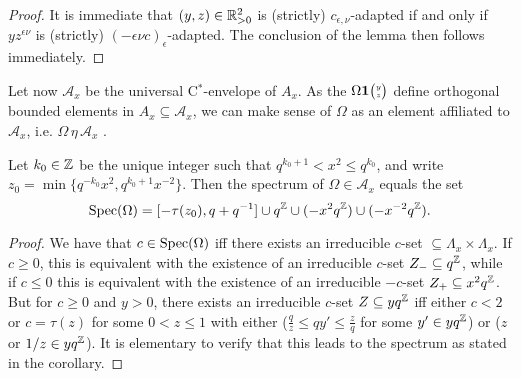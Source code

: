 \begin{proof} It is immediate that $(y,z)\in \mathbb{R}_{>0}^2$ is (strictly) $c_{\epsilon,\nu}$-adapted if and only if $yz^{\epsilon\nu}$ is (strictly) $(-\epsilon\nu c)_{\epsilon}$-adapted. The conclusion of the lemma then follows immediately.
\end{proof}

Let now $\mathcal{A}_x$ be the universal C$^*$-envelope of $A_x$. As the $\Omega\mathbf{1}{\tiny {\begin{pmatrix} y\\z\end{pmatrix}}}$ define orthogonal bounded elements in $A_x\subseteq \mathcal{A}_x$, we can make sense of $\Omega$ as an element affiliated to $\mathcal{A}_x$, i.e. $\Omega\,\eta\,\mathcal{A}_x$ \cite{Wor2}. 


\begin{Cor} Let $k_0\in \mathbb{Z}$ be the unique integer such that $q^{k_0+1}<x^2\leq q^{k_0}$, and write $z_{0} = \min \{q^{-k_0}x^2,q^{k_0+1}x^{-2}\}$. Then the spectrum of $\Omega \in \mathcal{A}_x$ equals the set \[\operatorname{\mathrm{Spec}}(\Omega) = \lbrack -\tau(z_0),q+q^{-1}\rbrack \cup q^{\mathbb{Z}}\cup (-x^2q^{\mathbb{Z}}) \cup (-x^{-2}q^{\mathbb{Z}}).\]
\end{Cor}
\begin{proof} We have that $c \in \operatorname{\mathrm{Spec}}(\Omega)$ iff there exists an irreducible $c$-set $\subseteq \Lambda_x\times \Lambda_x$. If $c\geq 0$, this is equivalent with the existence of an irreducible $c$-set $Z_- \subseteq q^{\mathbb{Z}}$, while if $c\leq 0$ this is equivalent with the existence of an irreducible $-c$-set $Z_+ \subseteq x^2q^{\mathbb{Z}}$. But for $c\geq0$ and $y>0$, there exists an irreducible $c$-set $Z\subseteq yq^{\mathbb{Z}}$ iff either $c<2$ or $c=\tau(z)$ for some $0<z\leq 1$ with either ($\frac{q}{z}\leq qy' \leq \frac{z}{q}$ for some $y'\in yq^{\mathbb{Z}}$) or ($z$ or $1/z \in yq^{\mathbb{Z}}$). It is elementary to verify that this leads to the spectrum as stated in the corollary.
\end{proof}



%

%


